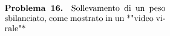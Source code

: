 \documentclass[letterpaper,10pt,italian]{jupyterBook}
\begin{document}
\sphinxAtStartPar
{}
\begin{equation*}
\begin{split}
\begin{minipage}[t]{.55\textwidth}
  \vspace{0pt}
  \textbf{Problema 16.}
  Sollevamento di un peso sbilanciato, come mostrato in un *"video virale"*
\end{minipage}
\hspace{.05\textwidth}
\begin{minipage}[t]{.40\textwidth}
\end{minipage}
\end{split}
\end{equation*}
\sphinxAtStartPar
{}

\sphinxstepscope
\end{document}
